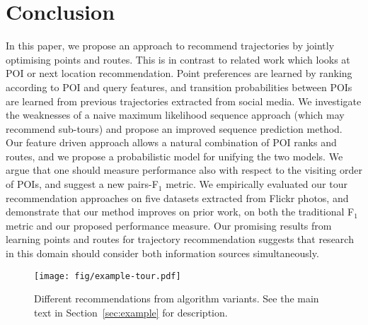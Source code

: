 \section{Conclusion}
\label{sec:conclusion}
\secmoveup

In this paper, we propose an approach to recommend trajectories
by jointly optimising points and routes.
This is in contrast to related work which looks at POI %
or next location recommendation.
Point preferences are learned by ranking according to POI and query features,
and transition probabilities between POIs are learned from previous trajectories extracted
from social media.
We investigate the weaknesses of a naive maximum likelihood sequence approach (which
may recommend sub-tours) and propose an improved sequence prediction method.
Our feature driven approach allows a natural combination of POI ranks and routes,
and we propose a probabilistic model for unifying the two models.
We argue that one should measure performance also with respect to the visiting order of POIs, 
and suggest a new pairs-F$_1$ metric.
We empirically evaluated our tour recommendation approaches on five datasets extracted from
Flickr photos, and demonstrate that our method improves on prior work, 
on both the traditional F$_1$ metric and our proposed performance measure.
Our promising results from learning points and routes for trajectory recommendation suggests
that research in this domain should consider both information sources simultaneously.


\begin{figure*}[t]
	\centering
	\texttt{[image: fig/example-tour.pdf]}
	\caption{Different recommendations from algorithm variants.
    See the main text in Section~\ref{sec:example} for description.}
	\label{fig:exampleresult}
	\captionmoveup
\end{figure*}
